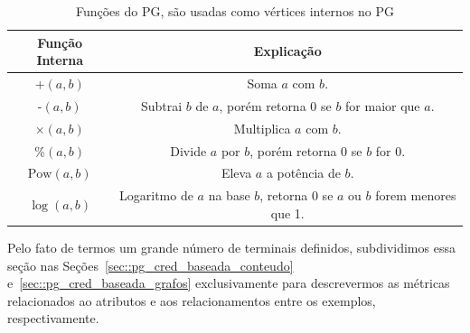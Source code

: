 
\begin{table}[ht*]
\centering
\caption{Funções do \textsc{PG}, são usadas como vértices internos no \textsc{PG}}
\begin{tabular}{|c|c|}
\toprule
    \textbf{Função Interna} & \textbf{Explicação} \\
\midrule
    +$(a,b)$           & Soma $a$ com $b$. \tabularnewline \hline
    -$(a,b)$           & Subtrai $b$ de $a$, porém retorna 0 se $b$ for maior que $a$.\tabularnewline \hline
    $\times(a,b)$       & Multiplica $a$ com $b$. \tabularnewline \hline
    \%$(a,b)$          & Divide $a$ por $b$, porém retorna 0 se $b$ for 0. \tabularnewline \hline
    $\text{Pow}(a,b)$  & Eleva $a$ a potência de $b$. \tabularnewline \hline 
    $\log(a,b) $       & Logaritmo de $a$ na base $b$, retorna 0 se $a$ ou $b$ forem menores que 1. \tabularnewline
\bottomrule
\end{tabular}
\label{table::funcoespg}
\end{table}

Pelo fato de termos um grande número de terminais definidos, subdividimos essa seção nas Seções~\ref{sec::pg_cred_baseada_conteudo} e~\ref{sec::pg_cred_baseada_grafos} exclusivamente para descrevermos as métricas relacionados ao atributos e aos relacionamentos entre os exemplos, respectivamente. 





